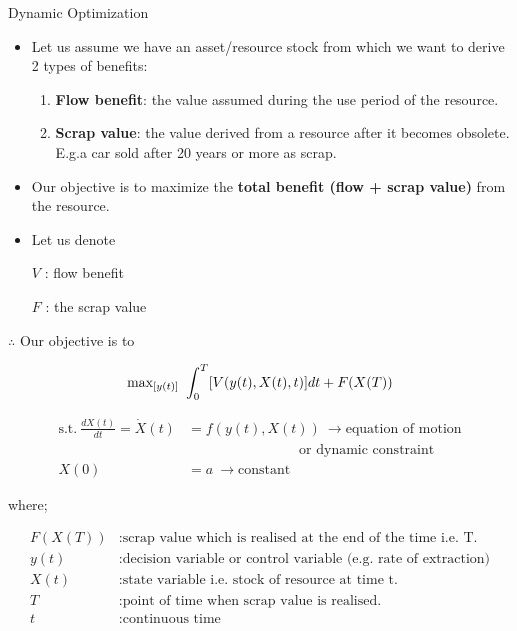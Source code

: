 \documentclass[
  ignorenonframetext,
]{beamer}
\providecommand{\tightlist}{%
  \setlength{\itemsep}{0pt}\setlength{\parskip}{0pt}}\usepackage{longtable,booktabs,array}
\begin{document}
\begin{frame}{Dynamic Optimization}
\label{dynamic-optimization}
\begin{itemize}
\item
  Let us assume we have an asset/resource stock from which we want to
  derive 2 types of benefits:

  \begin{enumerate}
  \tightlist
  \item
    \textbf{Flow benefit}: the value assumed during the use period of
    the resource.
  \item
    \textbf{Scrap value}: the value derived from a resource after it
    becomes obsolete. E.g.a car sold after 20 years or more as scrap.
  \end{enumerate}
\item
  Our objective is to maximize the \textbf{total benefit (flow + scrap
  value)} from the resource.
\item
  Let us denote

  \(V\) : flow benefit

  \(F\) : the scrap value
\end{itemize}
\end{frame}

\begin{frame}
\(\therefore\) Our objective is to

\begin{equation}
\text{max}_{[y(t)]} \ \int_0^T[V(y(t), X(t), t)]dt + F(X(T)) \\
\end{equation}

\begin{align}
\text{s.t.}\ \frac{d X(t)}{d t} = \dot{X}(t) &= f(y(t), X(t)) \ \to \text{equation of motion}\\
& \qquad \qquad \qquad \qquad \text{or dynamic constraint}\\
X(0) &= a \ \to \text{constant}
\end{align}

where;

\begin{align}
F(X(T)) &: \text{scrap value which is realised at the end of the time i.e. T.}\\
y(t) &: \text{decision variable or control variable (e.g. rate of extraction)}\\
X(t) &: \text{state variable i.e. stock of resource at time t.}\\
T &:\text{point of time when scrap value is realised.}\\
t &: \text{continuous time}
\end{align}
\end{frame}
\end{document}
